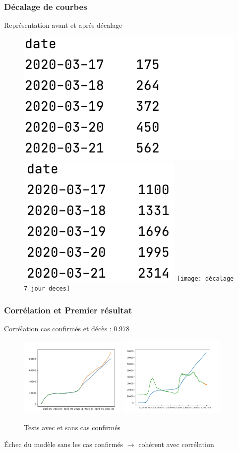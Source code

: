 \documentclass{beamer}
\begin{document}
\begin{frame}
	\frametitle{Décalage de courbes}
	Représentation avant et aprés décalage
	\begin{figure}[h]
		\centering
		\includegraphics[scale=0.5]{decal2}
		\includegraphics[scale=0.5]{decal1}
		\texttt{[image: décalage 7 jour deces]}
	\end{figure}
\end{frame}

\begin{frame}
	\frametitle{Corrélation et Premier résultat}
	Corrélation cas confirmés et décès : 0.978
	\begin{figure}[h]
		\centering
		\includegraphics[width=0.46\textwidth]{NN_1}
		\includegraphics[width=0.4617\textwidth]{NN mlpregressor 140k iter (updated data)}
		\caption{Tests avec et sans cas confirmés}
	\end{figure}
	Échec du modèle sans les cas confirmés $\rightarrow$ cohérent avec corrélation
\end{frame}
\end{document}
